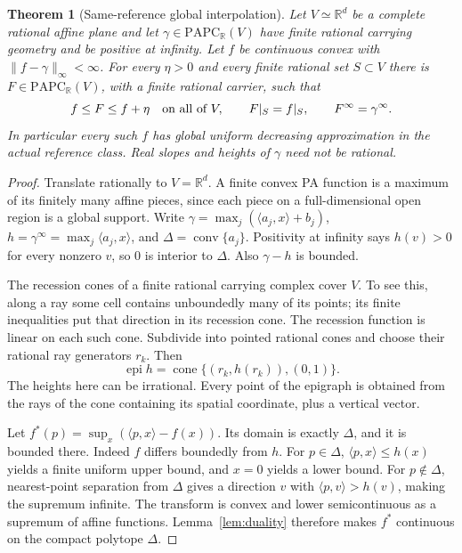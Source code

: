 \documentclass[11pt]{article}
\newtheorem{theorem}{Theorem}[section]
\theoremstyle{definition}\newtheorem{definition}[theorem]{Definition}
\theoremstyle{remark}\newtheorem{remark}[theorem]{Remark}
\newcommand{\R}{\mathbb R}\newcommand{\Q}{\mathbb Q}\newcommand{\Z}{\mathbb Z}
\newcommand{\PAPC}{\mathrm{PAPC}}\newcommand{\epi}{\operatorname{epi}}
\newcommand{\conv}{\operatorname{conv}}\newcommand{\cone}{\operatorname{cone}}
\begin{document}
\begin{theorem}[Same-reference global interpolation]\label{thm:affine}
Let $V\simeq\R^d$ be a complete rational affine plane and let $\gamma\in\PAPC_\R(V)$ have finite rational carrying geometry and be positive at infinity. Let $f$ be continuous convex with $\|f-\gamma\|_\infty<\infty$. For every $\eta>0$ and every finite rational set $S\subset V$ there is $F\in\PAPC_\R(V)$, with a finite rational carrier, such that
\[
 f\leq F\leq f+\eta\quad\hbox{on all of }V,\qquad F|_S=f|_S,
 \qquad F^\infty=\gamma^\infty.
\]
In particular every such $f$ has global uniform decreasing approximation in the actual reference class. Real slopes and heights of $\gamma$ need not be rational.
\end{theorem}
\begin{proof}
Translate rationally to $V=\R^d$. A finite convex PA function is a maximum of its finitely many affine pieces, since each piece on a full-dimensional open region is a global support. Write $\gamma=\max_j(\langle a_j,x\rangle+b_j)$, $h=\gamma^\infty=\max_j\langle a_j,x\rangle$, and $\Delta=\conv\{a_j\}$. Positivity at infinity says $h(v)>0$ for every nonzero $v$, so $0$ is interior to $\Delta$. Also $\gamma-h$ is bounded.

The recession cones of a finite rational carrying complex cover $V$. To see this, along a ray some cell contains unboundedly many of its points; its finite inequalities put that direction in its recession cone. The recession function is linear on each such cone. Subdivide into pointed rational cones and choose their rational ray generators $r_k$. Then
\[
 \epi h=\cone\{(r_k,h(r_k)),(0,1)\}.
\]
The heights here can be irrational. Every point of the epigraph is obtained from the rays of the cone containing its spatial coordinate, plus a vertical vector.

Let $f^*(p)=\sup_x(\langle p,x\rangle-f(x))$. Its domain is exactly $\Delta$, and it is bounded there. Indeed $f$ differs boundedly from $h$. For $p\in\Delta$, $\langle p,x\rangle\leq h(x)$ yields a finite uniform upper bound, and $x=0$ yields a lower bound. For $p\notin\Delta$, nearest-point separation from $\Delta$ gives a direction $v$ with $\langle p,v\rangle>h(v)$, making the supremum infinite. The transform is convex and lower semicontinuous as a supremum of affine functions. Lemma~\ref{lem:duality} therefore makes $f^*$ continuous on the compact polytope $\Delta$.


\end{proof}
\end{document}
